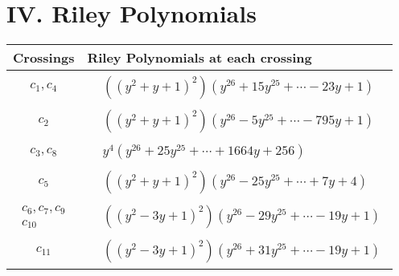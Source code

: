 \documentclass[1p]{elsarticle_modified}
\theoremstyle{definition}
\begin{document}
\centering \section*{ IV. Riley Polynomials}
\begin{tabular}{m{50pt}|m{274pt}}
Crossings & \hspace{64pt}Riley Polynomials at each crossing \\
\hline $$\begin{aligned}c_{1},c_{4}\end{aligned}$$&$\begin{aligned}
&((y^2+y+1)^2)(y^{26}+15 y^{25}+\cdots-23 y+1)
\end{aligned}$\\
\hline $$\begin{aligned}c_{2}\end{aligned}$$&$\begin{aligned}
&((y^2+y+1)^2)(y^{26}-5 y^{25}+\cdots-795 y+1)
\end{aligned}$\\
\hline $$\begin{aligned}c_{3},c_{8}\end{aligned}$$&$\begin{aligned}
&y^4(y^{26}+25 y^{25}+\cdots+1664 y+256)
\end{aligned}$\\
\hline $$\begin{aligned}c_{5}\end{aligned}$$&$\begin{aligned}
&((y^2+y+1)^2)(y^{26}-25 y^{25}+\cdots+7 y+4)
\end{aligned}$\\
\hline $$\begin{aligned}c_{6},c_{7},c_{9}\\c_{10}\end{aligned}$$&$\begin{aligned}
&((y^2-3 y+1)^2)(y^{26}-29 y^{25}+\cdots-19 y+1)
\end{aligned}$\\
\hline $$\begin{aligned}c_{11}\end{aligned}$$&$\begin{aligned}
&((y^2-3 y+1)^2)(y^{26}+31 y^{25}+\cdots-19 y+1)
\end{aligned}$\\
\hline
\end{tabular}
\vskip 2pc
\end{document}
